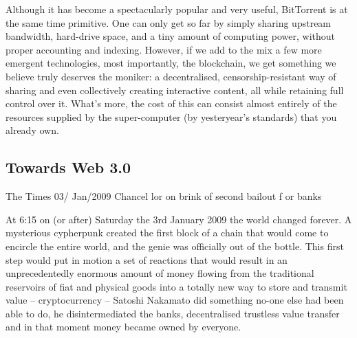 Although it has become a spectacularly popular and very useful, BitTorrent is at the same time primitive. One can only get so far by simply sharing upstream bandwidth, hard-drive space, and a tiny amount of computing power, without proper accounting and indexing. However, if we add to the mix a few more emergent technologies, most importantly, the blockchain, we get something we believe truly deserves the  moniker: a decentralised, censorship-resistant way of sharing and even collectively creating interactive content, all while retaining full control over it. What's more, the cost of this can consist almost entirely of the resources supplied by the super-computer (by yesteryear's standards) that you already own.

\subsection{Towards Web 3.0 \statusgreen}\label{sec:towards-web3}


\begin{displayquote}
The Times 03/
Jan/2009 Chancel
lor on brink of 
second bailout f
or banks
\end{displayquote}

At 6:15 on (or after) Saturday the 3rd January 2009 the world changed forever. A mysterious cypherpunk created the first block of a chain that would come to encircle the entire world, and the genie was officially out of the bottle. This first step would put in motion a set of reactions that would result in an unprecedentedly enormous amount of money flowing from the traditional reservoirs of fiat and physical goods into a totally new way to store and transmit value -- cryptocurrency -- Satoshi Nakamato did something no-one else had been able to do, he disintermediated the banks, decentralised trustless value transfer and in that moment money became owned by everyone.

